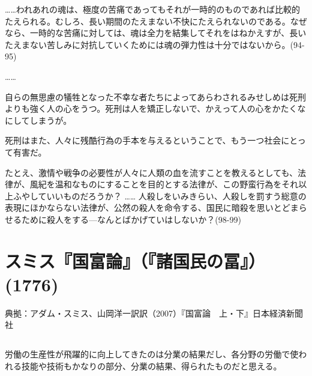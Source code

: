……われあれの魂は、極度の苦痛であってもそれが一時的のものであれば比較的たえられる。むしろ、長い期間のたえまない不快にたえられないのである。なぜなら、一時的な苦痛に対しては、魂は全力を結集してそれをはねかえすが、長いたえまない苦しみに対抗していくためには魂の弾力性は十分ではないから。(94-95)

……

自らの無思慮の犠牲となった不幸な者たちによってあらわされるみせしめは死刑よりも強く人の心をうつ。死刑は人を矯正しないで、かえって人の心をかたくなにしてしまうが。

死刑はまた、人々に残酷行為の手本を与えるということで、もう一つ社会にとって有害だ。

たとえ、激情や戦争の必要性が人々に人類の血を流すことを教えるとしても、法律が、風紀を温和なものにすることを目的とする法律が、この野蛮行為をそれ以上ふやしていいものだろうか？ …… 人殺しをいみきらい、人殺しを罰すう総意の表現にほかならない法律が、公然の殺人を命令する、国民に暗殺を思いとどまらせるために殺人をする{\——}なんとばかげていはしないか？(98-99)












\section{スミス『国富論』（『諸国民の冨』）(1776)}




典拠：アダム・スミス、山岡洋一訳訳（2007）『国富論　上・下』日本経済新聞社


\subsection{}

労働の生産性が飛躍的に向上してきたのは分業の結果だし、各分野の労働で使われる技能や技術もかなりの部分、分業の結果、得られたものだと思える。

